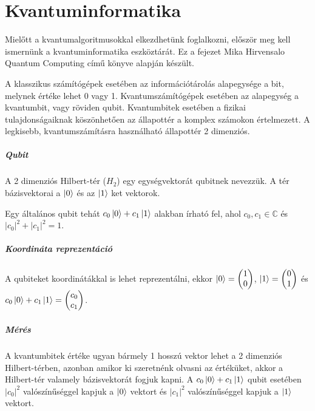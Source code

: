 \chapter{Kvantuminformatika}

Mielőtt a kvantumalgoritmusokkal elkezdhetünk foglalkozni, először meg kell
ismernünk a kvantuminformatika eszköztárát. Ez a fejezet Mika
Hirvensalo Quantum Computing című könyve \cite{Hirvensalo} alapján készült.

A klasszikus számítógépek esetében az információtárolás alapegysége a bit,
melynek értéke lehet 0 vagy 1. Kvantumszámítógépek esetében az alapegység a
kvantumbit, vagy röviden qubit. Kvantumbitek esetében a fizikai
tulajdonságaiknak köszönhetően az állapottér a komplex számokon értelmezett. A
legkisebb, kvantumszámításra használható állapottér 2 dimenziós.

\paragraph{Qubit} A 2 dimenziós Hilbert-tér ($H_2$) egy egységvektorát qubitnek
nevezzük. A tér bázisvektorai a $\ket{0}$ és az $\ket{1}$ ket vektorok.

Egy általános qubit tehát $c_0\ket{0} + c_1\ket{1}$ alakban írható fel, ahol
$c_0, c_1 \in{} \mathds{C}$ és $|c_0|^2 + |c_1|^2 = 1$.

\paragraph{Koordináta reprezentáció} A qubiteket koordinátákkal is lehet
reprezentálni, ekkor $\ket{0} = \begin{pmatrix} 1 \\ 0 \end{pmatrix}$, $\ket{1}
  = \begin{pmatrix} 0 \\ 1 \end{pmatrix}$ és $c_0\ket{0} + c_1\ket{1} =
  \begin{pmatrix} c_0 \\ c_1 \end{pmatrix}$.

\paragraph{Mérés} A kvantumbitek értéke ugyan bármely 1 hosszú vektor lehet a 2
dimenziós Hilbert-térben, azonban amikor ki szeretnénk olvasni az értéküket,
akkor a Hilbert-tér valamely bázisvektorát fogjuk kapni. A $c_0\ket{0} +
  c_1\ket{1}$ qubit esetében $|c_0|^2$ valószínűséggel kapjuk a $\ket{0}$ vektort
és $|c_1|^2$ valószínűséggel kapjuk a $\ket{1}$ vektort.

